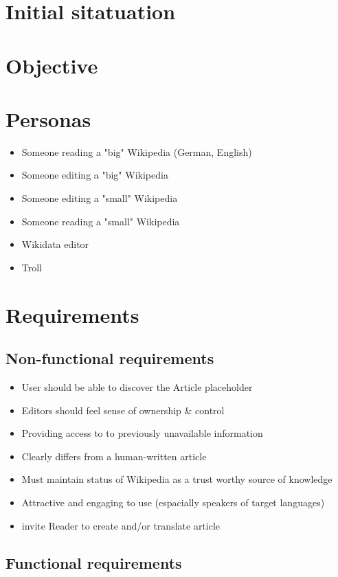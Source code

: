 \documentclass[11pt]{article}
\begin{document}
\section{Initial sitatuation}

\section{Objective}

\section{Personas}

\begin{itemize}
\item Someone reading a "big" Wikipedia (German, English)
\item Someone editing a "big" Wikipedia
\item Someone editing a "small" Wikipedia
\item Someone reading a "small" Wikipedia 
\item Wikidata editor
\item Troll
\end{itemize}

\section{Requirements} 
\subsection{Non-functional requirements}

\begin{itemize}
\item User should be able to discover the Article placeholder
\item Editors should feel sense of ownership \& control
\item Providing access to to previously unavailable information
\item Clearly differs from a human-written article
\item Must maintain status of Wikipedia as a trust worthy source of knowledge
\item Attractive and engaging to use (espacially speakers of target languages)
\item invite Reader to create and/or translate article
\end{itemize}

\subsection{Functional requirements}
\end{document}
